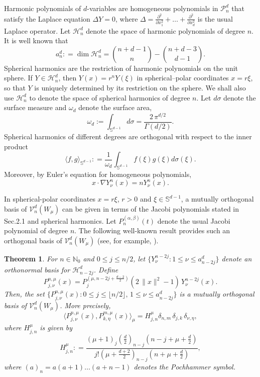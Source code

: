 \documentclass{amsart}
\theoremstyle{plain}%
\newtheorem{thm}{Theorem}[section]
\theoremstyle{definition}
\theoremstyle{remark}
\begin{document}
Harmonic polynomials of $d$-variables are homogeneous polynomials in $\mathcal{P}_n^d$ that satisfy the Laplace equation $\Delta Y = 0$, where 
\(\Delta = \frac{\partial^2}{\partial x_1^2} + \ldots + \frac{\partial^2}{\partial x_d^2}\) is the usual Laplace operator. Let $\mathcal{H}_n^d$ denote the space of harmonic polynomials of degree $n$. It is well known that
$$
         a_n^d: = \dim \mathcal{H}_n^d = \binom{n+d-1}{n} - \binom{n+d-3}{d-1}.
$$
Spherical harmonics are the restriction of harmonic polynomials on the unit sphere. If $Y \in \mathcal{H}_n^d$, {then} $Y(x) = r^n Y(\xi)$ in spherical–polar {coordinates} $x = r \xi$, so that 
$Y$ is uniquely determined by its restriction on the sphere. We shall also use $\mathcal{H}_n^d$ to denote the space of spherical harmonics of degree $n$. Let $d \sigma$ denote the surface measure
and $\omega_d$ denote the surface area, 
$$
  \omega_d := \int_{\mathbb{S}^{d-1}} d\sigma = \frac{2\, \pi^{d/2}}{\Gamma(d/2)}.
$$
Spherical harmonics of different degrees are orthogonal with respect to the inner product
\[
   \langle f, g \rangle_{\mathbb{S}^{d-1}}: = \frac{1}{\omega_d} \int_{\mathbb{S}^{d-1}} f(\xi) g(\xi) d\sigma(\xi). 
\]
Moreover, by Euler's equation for homogeneous polynomials, 
\[x \cdot \nabla Y_\nu^n(x) = n Y_\nu^n(x).
\]

In spherical-polar coordinates $x = r \xi$, $ r > 0$ and $\xi \in \mathbb{S}^{d-1}$, a mutually orthogonal basis of $\mathcal{V}_n^d(W_\mu)$ can be given in terms of the Jacobi polynomials stated in Sec.2.1 and spherical harmonics. Let $P_n^{(\alpha,\beta)}(t)$ denote the usual Jacobi polynomial of degree $n$.
The following well-known result provides such an orthogonal basis of $\mathcal{V}_n^d(W_\mu)$ (see, for example, \cite{DX}). 

\begin{thm}
For $n \in \mathbb{N}_0$ and $0 \le j \le n/2$, let $\{Y_\nu^{n-2j}: 1\le \nu\le a_{n-2j}^d\}$ denote an orthonormal basis for $\mathcal{H}_{n-2j}^d$. Define 
\begin{equation}\label{baseP}
P_{j,\nu}^{n,\mu}(x) = P_{j}^{(\mu, n-2j + \frac{d-2}{2})}(2\,\|x\|^2 -1)\, Y_\nu^{n-2j}(x). 
\end{equation}
Then, the set $\{P_{j,\nu}^{n,\mu}(x): 0 \le j \le \lfloor n/2 \rfloor, \,1 \le \nu \le a_{n-2j}^d \}$ is a mutually
orthogonal basis of $\mathcal{V}_n^d(W_\mu)$. More precisely, 
$$
\langle P_{j,\nu}^{n,\mu}(x), P_{k,\eta}^{m,\mu}(x)\rangle_\mu =  H_{j,n}^{\mu}  \delta_{n,m}\,\delta_{j,k}\,\delta_{\nu,\eta},
$$
where $H_{j,n}^{\mu}$ is given by 
\begin{equation} \label{eq:Hjn-mu}
 H_{j,n}^{\mu}: = \frac{(\mu +1)_j (\frac{d}{2})_{n-j} (n-j+\mu+ \frac{d}{2})}
    { j! (\mu+\frac{d+2}{2})_{n-j} (n+\mu+ \frac{d}{2})}, 
\end{equation} 
{where $(a)_n= a(a+1) \ldots (a+n-1)$ denotes the Pochhammer symbol.} 
\end{thm}
\end{document}
